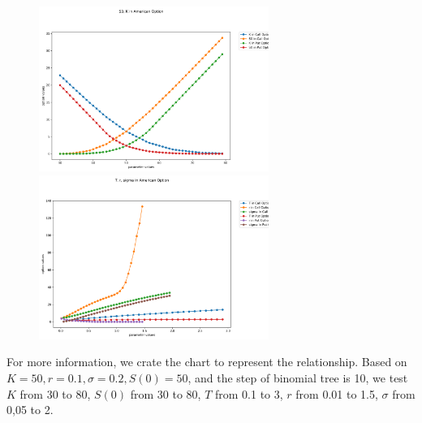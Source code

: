 \documentclass[11pt,a4paper]{article}
\begin{document}
    \begin{figure}[htbp]
        \centering
        \begin{minipage}[t]{0.48\textwidth}
        \centering
        \includegraphics[width=7.5cm]{S0KAO}
        \end{minipage}
        \begin{minipage}[t]{0.48\textwidth}
        \centering
        \includegraphics[width=7.5cm]{TrsigmaAO}
        \end{minipage}
    \end{figure}


    For more information, we crate the chart to represent
    the relationship.
    Based on $K=50, r=0.1, \sigma=0.2, S(0)=50$, 
    and the step of binomial tree is 10,
    we test $K$ from 30 to 80, $S(0)$ from 30 to 80, 
    $T$ from 0.1 to 3, $r$ from 0.01 to 1.5, 
    $\sigma$ from 0,05 to 2. 
\end{document}
